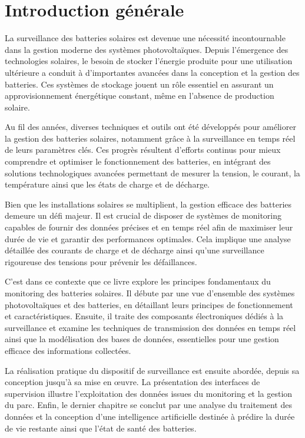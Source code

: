 \chapter*{Introduction générale}
{}  

La surveillance des batteries solaires est devenue une nécessité incontournable dans la gestion moderne des systèmes photovoltaïques. Depuis l'émergence des technologies solaires, le besoin de stocker l'énergie produite pour une utilisation ultérieure a conduit à d’importantes avancées dans la conception et la gestion des batteries. Ces systèmes de stockage jouent un rôle essentiel en assurant un approvisionnement énergétique constant, même en l’absence de production solaire.  


Au fil des années, diverses techniques et outils ont été développés pour améliorer la gestion des batteries solaires, notamment grâce à la surveillance en temps réel de leurs paramètres clés. Ces progrès résultent d’efforts continus pour mieux comprendre et optimiser le fonctionnement des batteries, en intégrant des solutions technologiques avancées permettant de mesurer la tension, le courant, la température ainsi que les états de charge et de décharge.  


Bien que les installations solaires se multiplient, la gestion efficace des batteries demeure un défi majeur. Il est crucial de disposer de systèmes de monitoring capables de fournir des données précises et en temps réel afin de maximiser leur durée de vie et garantir des performances optimales. Cela implique une analyse détaillée des courants de charge et de décharge ainsi qu’une surveillance rigoureuse des tensions pour prévenir les défaillances.  


C’est dans ce contexte que ce livre explore les principes fondamentaux du monitoring des batteries solaires. Il débute par une vue d’ensemble des systèmes photovoltaïques et des batteries, en détaillant leurs principes de fonctionnement et caractéristiques. Ensuite, il traite des composants électroniques dédiés à la surveillance et examine les techniques de transmission des données en temps réel ainsi que la modélisation des bases de données, essentielles pour une gestion efficace des informations collectées.

La réalisation pratique du dispositif de surveillance est ensuite abordée, depuis sa conception jusqu’à sa mise en œuvre. La présentation des interfaces de supervision illustre l’exploitation des données issues du monitoring et la gestion du parc. Enfin, le dernier chapitre se conclut par une analyse du traitement des données et la conception d’une intelligence artificielle destinée à prédire la durée de vie restante ainsi que l’état de santé des batteries.
